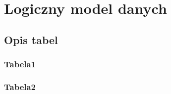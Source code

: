 \section{Logiczny model danych}

\subsection{Opis tabel}

\subsubsection{Tabela1}
\subsubsection{Tabela2}